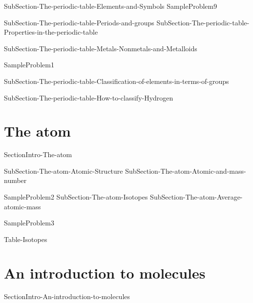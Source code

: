 \documentclass[main.tex]{subfiles}
\begin{document}
\sloppy
\begin{description}
{SubSection-The-periodic-table-Elements-and-Symbols}
{SampleProblem9}

{SubSection-The-periodic-table-Periods-and-groups}
{SubSection-The-periodic-table-Properties-in-the-periodic-table}

{SubSection-The-periodic-table-Metals-Nonmetals-and-Metalloids}




{SampleProblem1}


{SubSection-The-periodic-table-Classification-of-elements-in-terms-of-groups}


{SubSection-The-periodic-table-How-to-classify-Hydrogen}


 \end{description}








\section{The atom}
{SectionIntro-The-atom}




   
\sloppy
\begin{description}
{SubSection-The-atom-Atomic-Structure}
{SubSection-The-atom-Atomic-and-mass-number}


 
 



{SampleProblem2}
{SubSection-The-atom-Isotopes}
{SubSection-The-atom-Average-atomic-mass}






{SampleProblem3}


 {Table-Isotopes}




\end{description}







\section{An introduction to molecules}
{SectionIntro-An-introduction-to-molecules}
\end{document}
